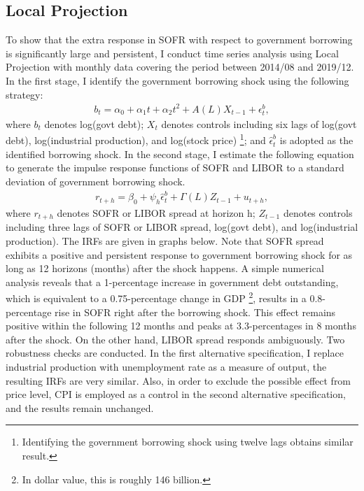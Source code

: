 \documentclass[12pt]{article}
\begin{document}
\subsection{Local Projection}
To show that the extra response in SOFR with respect to government borrowing is significantly large and persistent,
I conduct time series analysis using Local Projection with monthly data covering the period
between 2014/08 and 2019/12. In the first stage, I identify the government borrowing shock
using the following strategy:
\begin{align*}
  b_t=\alpha_0+\alpha_1t+\alpha_2t^2+A(L)X_{t-1}+\epsilon_t^b,
\end{align*}
where $b_t$ denotes log(govt debt); $X_t$ denotes controls including six lags of log(govt debt), log(industrial production), and log(stock price)
\footnote{Identifying the government borrowing shock using twelve lags obtains similar result.}; and
$\hat{\epsilon}_t^b$ is adopted as the identified borrowing shock. In the second stage, I estimate the following equation to generate the impulse response functions of SOFR and LIBOR to a standard deviation of government
borrowing shock.
\begin{align*}
  r_{t+h}=\beta_0+\psi_h \hat{\epsilon}_t^b +\Gamma(L)Z_{t-1}+u_{t+h},
\end{align*}
where $r_{t+h}$ denotes SOFR or LIBOR spread at horizon h; $Z_{t-1}$ denotes controls including three lags of SOFR or LIBOR spread, log(govt debt), and log(industrial production).
The IRFs are given in graphs below. Note that SOFR spread exhibits a positive and persistent response to government
borrowing shock for as long as 12 horizons (months) after the shock happens. A simple numerical analysis reveals that a 1-percentage increase in government debt outstanding, which is equivalent to a
0.75-percentage change in GDP \footnote{In dollar value, this is roughly 146 billion.}, results in a 0.8-percentage rise in SOFR right after the borrowing shock. 
This effect remains positive within the following 12 months and peaks at 3.3-percentages in 8 months after the shock.
On the other hand, LIBOR spread responds ambiguously. Two robustness checks are conducted. In the first alternative specification, I replace industrial production with unemployment rate as a measure of output,
the resulting IRFs are very similar. Also, in order to exclude the possible effect from price level, CPI is employed as a control in the second alternative specification, and the results remain unchanged.
\end{document}
